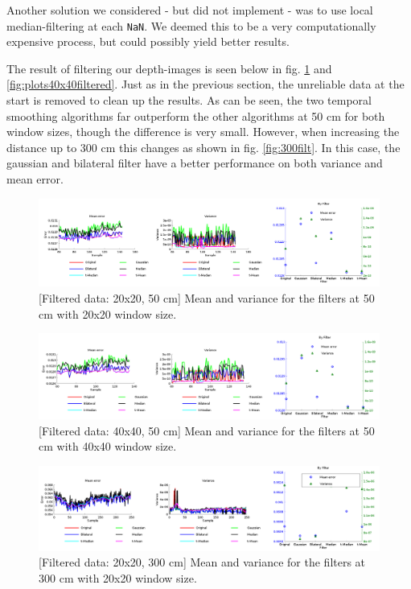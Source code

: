 \documentclass[11pt]{article}
\begin{document}
Another solution we considered - but did not implement - was to use local
median-filtering at each \texttt{NaN}. We deemed this to be a very
computationally expensive process, but could possibly yield better results. \par

The result of filtering our depth-images is seen below in
fig. \ref{fig:plots20x20filtered} and \vref{fig:plots40x40filtered}. Just as in
the previous section, the unreliable data at the start is removed to clean up
the results. As can be seen, the two temporal smoothing algorithms far
outperform the other algorithms at 50 cm for both window sizes, though the
difference is very small. However, when increasing the distance up to 300 cm
this changes as shown in fig. \vref{fig:300filt}. In this case, the gaussian and bilateral filter have a better performance on both variance and mean error. 

\begin{figure}[ht]
  \centering
  \includegraphics[width=1\textwidth]{figures/plot20x20filtered.png}
  [Filtered data: 20x20, 50 cm]{\label{fig:plots20x20filtered}
    Mean and variance for the filters at 50 cm with 20x20 window size.}
\end{figure}
\begin{figure}[ht]
  \begin{center}
    \includegraphics[width=1\textwidth]{figures/plot40x40filtered.png}
    [Filtered data: 40x40, 50
    cm]{\label{fig:plots40x40filtered} Mean and variance for the filters at 50
      cm with 40x40 window size.}
  \end{center}
\end{figure}

\begin{figure}[ht]
  \begin{center}
    \includegraphics[width=1\textwidth]{figures/filtered300cm.png}
    [Filtered data: 20x20, 300 cm]{\label{fig:300filt} Mean
      and variance for the filters at 300 cm with 20x20 window size.}
  \end{center}
\end{figure}
\end{document}
